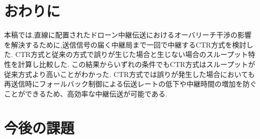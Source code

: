 \documentclass[a4paper,10.5pt]{ltjsarticle}
\begin{document}
\section{おわりに}
本稿では,直線に配置されたドローン中継伝送におけるオーバリーチ干渉の影響を解決するために,送信信号の届く中継局まで一回で中継するCTR方式を検討した.
CTR方式と従来の方式で誤りが生じた場合と生じない場合のスループット特性を計算し比較した.
この結果からいずれの条件でもCTR方式はスループットが従来方式より高いことがわかった.
CTR方式では誤りが発生した場合においても再送信時にフォールバック制御による伝送レートの低下や中継時間の増加を防ぐことができるため、高効率な中継伝送が可能である.
\clearpage
\section{今後の課題}
\end{document}
